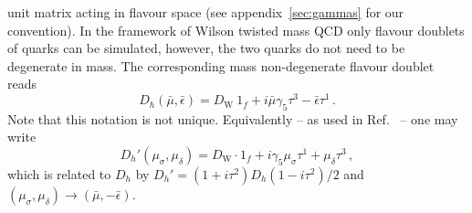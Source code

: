 unit matrix acting in flavour space (see appendix~\ref{sec:gammas} for
our convention). In the framework of Wilson twisted mass QCD only
flavour doublets of quarks can be simulated, however, the two quarks
do not need to be degenerate in mass. The corresponding mass
non-degenerate flavour doublet reads~\cite{Frezzotti:2003xj}
\begin{equation}
  \label{eq:Dh}
  D_h(\bar\mu, \bar\epsilon)  = D_\mathrm{W}\ 1_f +
  i\bar\mu\gamma_5\tau^3 - \bar\epsilon \tau^1 \, .
\end{equation}
Note that this notation is not unique. Equivalently -- as used in
Ref.~\cite{Chiarappa:2006ae} -- one may write
\begin{equation}
  \label{eq:altDh}
  D_h'(\mu_\sigma,\mu_\delta) = D_\mathrm{W}\cdot 1_f +
  i\gamma_5\mu_\sigma\tau^1 + \mu_\delta \tau^3\, ,
\end{equation}
which is related to $D_h$ by $D_h' = (1+i\tau^2)D_h(1-i\tau^2)/2$
and $(\mu_\sigma,\mu_\delta)\to(\bar\mu, -\bar\epsilon)$. 

